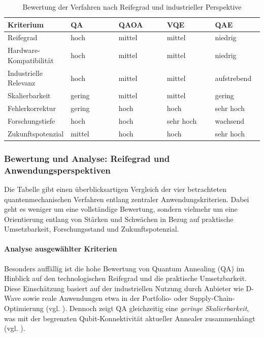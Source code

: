 \begin{table}[H]
\centering
\caption{Bewertung der Verfahren nach Reifegrad und industrieller Perspektive}
\renewcommand{\arraystretch}{1.2}
\begin{tabular}{|p{0.24\linewidth}|p{0.19\linewidth}|p{0.19\linewidth}|p{0.19\linewidth}|p{0.19\linewidth}|}
\hline
\textbf{Kriterium} & \textbf{QA} & \textbf{QAOA} & \textbf{VQE} & \textbf{QAE} \\
\hline
Reifegrad & hoch & mittel & mittel & niedrig \\
\hline
Hardware-Kompatibilität & hoch & mittel & mittel & niedrig \\
\hline
Industrielle Relevanz & hoch & mittel & mittel & aufstrebend \\
\hline
Skalierbarkeit & gering & mittel & mittel & gering \\
\hline
Fehlerkorrektur & gering & hoch & hoch & sehr hoch \\
\hline
Forschungstiefe & hoch & hoch & sehr hoch & wachsend \\
\hline
Zukunftspotenzial & mittel & hoch & hoch & sehr hoch \\
\hline
\end{tabular}
\end{table}


\subsubsection*{Bewertung und Analyse: Reifegrad und Anwendungsperspektiven}

Die Tabelle gibt einen überblicksartigen Vergleich der vier betrachteten quantenmechanischen Verfahren entlang zentraler Anwendungskriterien. Dabei geht es weniger um eine vollständige Bewertung, sondern vielmehr um eine Orientierung entlang von Stärken und Schwächen in Bezug auf praktische Umsetzbarkeit, Forschungsstand und Zukunftspotenzial.


\paragraph{Analyse ausgewählter Kriterien}

Besonders auffällig ist die hohe Bewertung von Quantum Annealing (QA) im Hinblick auf den technologischen Reifegrad und die praktische Umsetzbarkeit. Diese Einschätzung basiert auf der industriellen Nutzung durch Anbieter wie D-Wave sowie reale Anwendungen etwa in der Portfolio- oder Supply-Chain-Optimierung (vgl. \cite{mugel_dynamic_2022, sakuler_real-world_2025}). Dennoch zeigt QA gleichzeitig eine \emph{geringe Skalierbarkeit}, was mit der begrenzten Qubit-Konnektivität aktueller Annealer zusammenhängt (vgl. \cite{sakuler_real-world_2025}).

